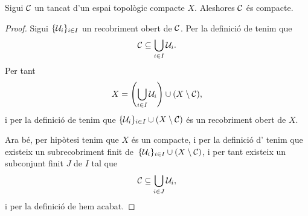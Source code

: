 \documentclass[../../Main.tex]{subfiles}
\begin{document}
	\begin{theorem}
		\label{thm:un tancat en un compacte és compacte}
		Sigui \(\mathcal{C}\) un tancat d'un espai topològic compacte \(X\). Aleshores \(\mathcal{C}\) és compacte.
		\begin{proof}
			Sigui \(\{\mathcal{U}_{i}\}_{i\in I}\) un recobriment obert de \(\mathcal{C}\). Per la definició de  tenim que
			\[
			    \mathcal{C}\subseteq\bigcup_{i\in I}\mathcal{U}_{i}.
			\]
			Per tant %
			\[
			    X=\left(\bigcup_{i\in I}\obert{U}_{i}\right)\cup(X\setminus\tancat{C}),
			\]
			i per la definició de  tenim que \(\{\mathcal{U}_{i}\}_{i\in I}\cup(X\setminus\mathcal{C})\) és un recobriment obert de \(X\).
			
			Ara bé, per hipòtesi tenim que \(X\) és un compacte, i per la definició d' tenim que existeix un subrecobriment finit de~\(\{\mathcal{U}_{i}\}_{i\in I}\cup(X\setminus\mathcal{C})\), i per tant existeix un subconjunt finit \(J\) de \(I\) tal que
			\[
			    \mathcal{C}\subseteq\bigcup_{i\in J}\mathcal{U}_{i},
			\]
			i per la definició de  hem acabat.
		\end{proof}
	\end{theorem}
\end{document}
